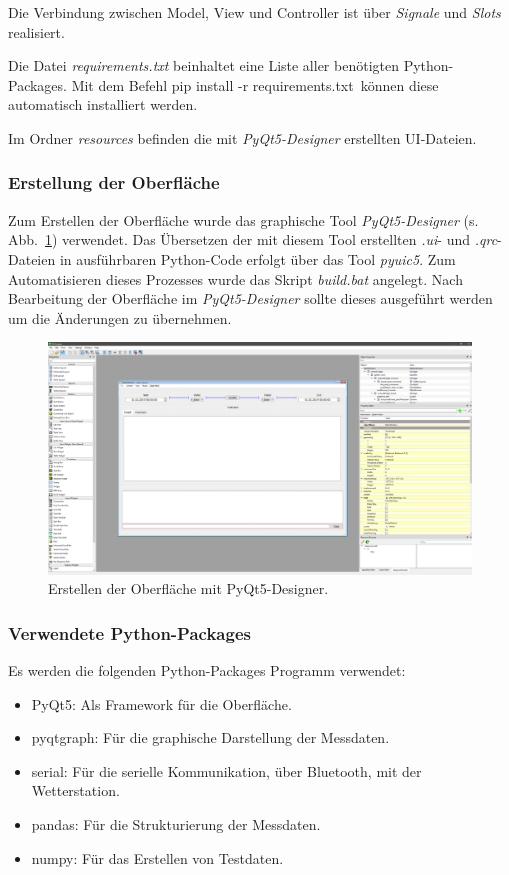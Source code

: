 Die Verbindung zwischen Model, View und Controller ist über \emph{Signale} und \emph{Slots} realisiert.

Die Datei \emph{requirements.txt} beinhaltet eine Liste aller benötigten Python-Packages. Mit dem Befehl \glqq\textrm{pip install -r requirements.txt}\grqq~können diese automatisch installiert werden.

Im Ordner \emph{resources} befinden die mit \emph{PyQt5-Designer} erstellten UI-Dateien.

\subsubsection*{Erstellung der Oberfläche}
Zum Erstellen der Oberfläche wurde das graphische Tool \emph{PyQt5-Designer} (s. Abb.~\ref{fig:ui_design}) verwendet. Das Übersetzen der mit diesem Tool erstellten \emph{.ui}- und \emph{.qrc}-Dateien in ausführbaren Python-Code erfolgt über das Tool \emph{pyuic5}. Zum Automatisieren dieses Prozesses wurde das Skript \emph{build.bat} angelegt. Nach Bearbeitung der Oberfläche im \emph{PyQt5-Designer} sollte dieses ausgeführt werden um die Änderungen zu übernehmen.
\begin{figure}[H]
  \centering
  \includegraphics[width=\textwidth]{./img/ui_design}
  \caption{Erstellen der Oberfläche mit PyQt5-Designer.}\label{fig:ui_design}
\end{figure}

\subsubsection*{Verwendete Python-Packages}
Es werden die folgenden Python-Packages Programm verwendet:
\begin{itemize}
\item PyQt5: Als Framework für die Oberfläche.
\item pyqtgraph: Für die graphische Darstellung der Messdaten.
\item serial: Für die serielle Kommunikation, über Bluetooth, mit der Wetterstation.
\item pandas: Für die Strukturierung der Messdaten.
\item numpy: Für das Erstellen von Testdaten.
\end{itemize}

